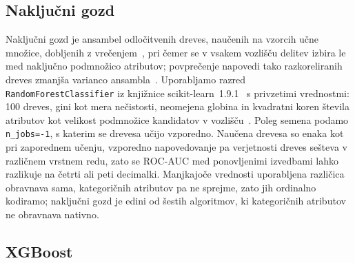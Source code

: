 \documentclass[a4paper,12pt,openright]{book}
\begin{document}


\subsection{Naključni gozd}
\label{sec:rf}

Naključni gozd je ansambel odločitvenih dreves,
naučenih na vzorcih učne množice, dobljenih z vrečenjem~\cite{breiman1996bagging},
pri čemer se v vsakem vozlišču delitev izbira le med naključno podmnožico
atributov; povprečenje napovedi tako razkoreliranih dreves zmanjša varianco
ansambla~\cite{breiman2001random}. Uporabljamo razred
\texttt{RandomForestClassifier} iz knjižnice
scikit-learn~1.9.1~\cite{pedregosa2011scikit} s privzetimi vrednostmi: 100
dreves, gini kot mera nečistosti, neomejena globina in kvadratni koren števila
atributov kot velikost podmnožice kandidatov v vozlišču~\cite{sklearndocsrf}.
Poleg semena podamo \texttt{n\_jobs=-1}, s katerim se drevesa učijo vzporedno.
Naučena drevesa so enaka kot pri zaporednem učenju, vzporedno napovedovanje pa
verjetnosti dreves sešteva v različnem vrstnem redu, zato se ROC-AUC med
ponovljenimi izvedbami lahko razlikuje na četrti ali peti decimalki. Manjkajoče
vrednosti uporabljena različica obravnava sama, kategoričnih atributov pa ne
sprejme, zato jih ordinalno kodiramo; naključni gozd je edini od šestih
algoritmov, ki kategoričnih atributov ne obravnava nativno.

\subsection{XGBoost}
\label{sec:xgboost}
\end{document}
